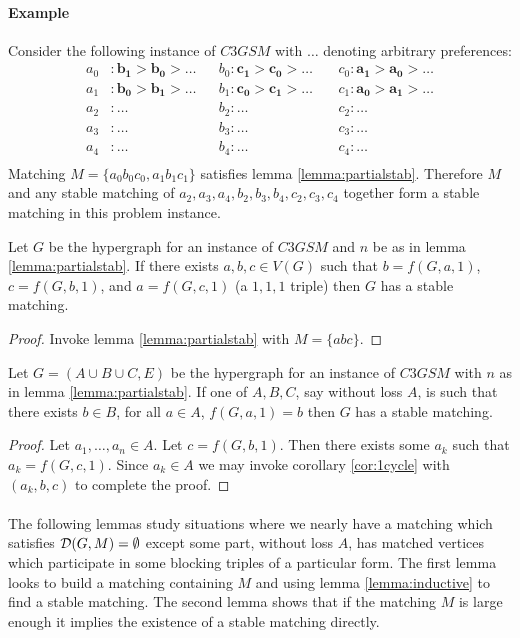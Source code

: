 \paragraph{Example}
Consider the following instance of $C3GSM$ with $\dots$ denoting arbitrary preferences:
\begin{align*}
a_0 &: \boldsymbol{b_1} > \boldsymbol{b_0} > \dots    &&b_0: \boldsymbol{c_1} > \boldsymbol{c_0}  > \dots  &\ &c_0:\boldsymbol{a_1} > \boldsymbol{a_0} > \dots\\
a_1 &: \boldsymbol{b_0} > \boldsymbol{b_1} > \dots    &&b_1: \boldsymbol{c_0} > \boldsymbol{c_1}  > \dots  &\ &c_1:\boldsymbol{a_0} > \boldsymbol{a_1} >\dots \\
a_2 &: \dots    &&b_2: \dots   &\ &c_2: \dots\\
a_3 &: \dots    &&b_3: \dots   &\ &c_3:\dots \\
a_4 &: \dots    &&b_4: \dots   &\ &c_4:\dots\\
\end{align*}
Matching $M = \{a_0b_0c_0, a_1b_1c_1\}$ satisfies lemma \ref{lemma:partialstab}. Therefore $M$ and any stable matching of $a_2,a_3,a_4,b_2,b_3,b_4,c_2,c_3,c_4$ together form a stable matching in this problem instance.
\begin{corollary}\label{cor:1cycle}
Let $G$ be the hypergraph for an instance of $C3GSM$ and $n$ be as in lemma \ref{lemma:partialstab}. If there exists $a,b,c \in V(G)$ such that $b = f(G,a,1)$, $c = f(G,b,1)$, and $a = f(G,c,1)$ (a $1,1,1$ triple) then $G$ has a stable matching.
\end{corollary}
\begin{proof}
Invoke lemma \ref{lemma:partialstab} with $M = \{abc\}$.
\end{proof}
\begin{corollary}
Let $G=(A\cup B \cup C, E)$ be the hypergraph for an instance of $C3GSM$ with $n$ as in lemma \ref{lemma:partialstab}. If one of $A,B,C$, say without loss $A$, is such that there exists $b \in B$, for all $a \in A$, $f(G,a,1) = b$ then $G$ has a stable matching.
\end{corollary}
\begin{proof}
Let $a_1, \dots, a_n \in A$. Let $c = f(G,b,1)$. Then there exists some $a_k$ such that $a_k = f(G,c,1)$. Since $a_k \in A$ we may invoke corollary \ref{cor:1cycle} with $(a_k, b, c)$ to complete the proof.
\end{proof}

\paragraph{}
The following lemmas study situations where we nearly have a matching which satisfies $\mathcal{D}(G,M) = \emptyset$ except some part, without loss $A$, has matched vertices which participate in some blocking triples of a particular form. The first lemma looks to build a matching containing $M$ and using lemma \ref{lemma:inductive} to find a stable matching. The second lemma shows that if the matching $M$ is large enough it implies the existence of a stable matching directly.

